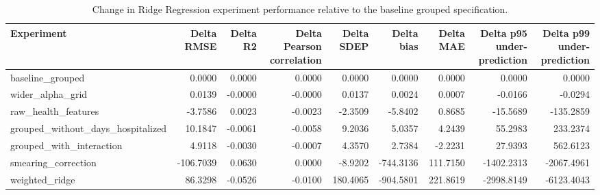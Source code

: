 \begin{table}
\caption{Change in Ridge Regression experiment performance relative to the baseline grouped specification.}
\label{tab:04-ridge-experiment-delta-from-baseline}
\begin{tabular}{lrrrrrrrr}
\toprule
Experiment & Delta RMSE & Delta R2 & Delta Pearson correlation & Delta SDEP & Delta bias & Delta MAE & Delta p95 under-prediction & Delta p99 under-prediction \\
\midrule
baseline_grouped & 0.0000 & 0.0000 & 0.0000 & 0.0000 & 0.0000 & 0.0000 & 0.0000 & 0.0000 \\
wider_alpha_grid & 0.0139 & -0.0000 & -0.0000 & 0.0137 & 0.0024 & 0.0007 & -0.0166 & -0.0294 \\
raw_health_features & -3.7586 & 0.0023 & -0.0023 & -2.3509 & -5.8402 & 0.8685 & -15.5689 & -135.2859 \\
grouped_without_days_hospitalized & 10.1847 & -0.0061 & -0.0058 & 9.2036 & 5.0357 & 4.2439 & 55.2983 & 233.2374 \\
grouped_with_interaction & 4.9118 & -0.0030 & -0.0007 & 4.3570 & 2.7384 & -2.2231 & 27.9393 & 562.6123 \\
smearing_correction & -106.7039 & 0.0630 & 0.0000 & -8.9202 & -744.3136 & 111.7150 & -1402.2313 & -2067.4961 \\
weighted_ridge & 86.3298 & -0.0526 & -0.0100 & 180.4065 & -904.5801 & 221.8619 & -2998.8149 & -6123.4043 \\
\bottomrule
\end{tabular}
\end{table}
